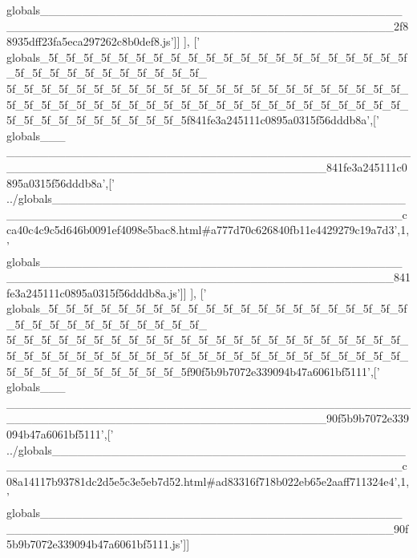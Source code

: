 \begin{DoxyCode}
{      globals\_\_\_\_\_\_\_\_\_\_\_\_\_\_\_\_\_\_\_\_\_\_\_\_\_\_\_\_\_\_\_\_\_\_\_\_\_\_\_\_\_\_\_\_\_\_\_\_\_\_\_\_\_\_\_\_\_\_\_\_\_\_\_\_\_\_\_\_\_\_\_\_\_\_\_\_\_\_\_\_\_\_\_\_\_\_\_\_\_2f88935dff23fa5eca297262c8b0def8.js'}]]
      ],
  [\textcolor{stringliteral}{'
      globals\_5f\_5f\_5f\_5f\_5f\_5f\_5f\_5f\_5f\_5f\_5f\_5f\_5f\_5f\_5f\_5f\_5f\_5f\_5f\_5f\_5f\_5f\_5f\_5f\_5f\_5f\_5f\_5f\_5f\_5f\_5f\_5f\_
      5f\_5f\_5f\_5f\_5f\_5f\_5f\_5f\_5f\_5f\_5f\_5f\_5f\_5f\_5f\_5f\_5f\_5f\_5f\_5f\_5f\_5f\_5f\_5f\_5f\_5f\_5f\_5f\_5f\_5f\_5f\_5f\_5f\_5f\_5f\_5f\_5f\_5f\_5f\_5f\_5f\_5f\_5f\_5f\_5f\_5f\_5f\_5f\_5f\_5f\_5f\_5f\_5f\_5f\_5f\_5f\_5f841fe3a245111c0895a0315f56dddb8a'},[\textcolor{stringliteral}{'
      globals\_\_\_
      \_\_\_\_\_\_\_\_\_\_\_\_\_\_\_\_\_\_\_\_\_\_\_\_\_\_\_\_\_\_\_\_\_\_\_\_\_\_\_\_\_\_\_\_\_\_\_\_\_\_\_\_\_\_\_\_\_\_\_\_\_\_\_\_\_\_\_\_\_\_\_\_\_\_\_\_\_\_\_\_\_\_\_\_\_\_841fe3a245111c0895a0315f56dddb8a'},[\textcolor{stringliteral}{'
      ../globals\_\_\_\_\_\_\_\_\_\_\_\_\_\_\_\_\_\_\_\_\_\_\_\_\_\_\_\_\_\_\_\_\_\_\_\_\_\_\_\_\_\_\_\_\_\_\_\_\_\_\_\_\_\_\_\_\_\_\_\_\_\_\_\_\_\_\_\_\_\_\_\_\_\_\_\_\_\_\_\_\_\_\_\_\_\_\_\_\_cca40c4c9c5d646b0091ef4098e5bac8.html#a777d70c626840fb11e4429279c19a7d3'},1,\textcolor{stringliteral}{'
      globals\_\_\_\_\_\_\_\_\_\_\_\_\_\_\_\_\_\_\_\_\_\_\_\_\_\_\_\_\_\_\_\_\_\_\_\_\_\_\_\_\_\_\_\_\_\_\_\_\_\_\_\_\_\_\_\_\_\_\_\_\_\_\_\_\_\_\_\_\_\_\_\_\_\_\_\_\_\_\_\_\_\_\_\_\_\_\_\_\_841fe3a245111c0895a0315f56dddb8a.js'}]]
      ],
  [\textcolor{stringliteral}{'
      globals\_5f\_5f\_5f\_5f\_5f\_5f\_5f\_5f\_5f\_5f\_5f\_5f\_5f\_5f\_5f\_5f\_5f\_5f\_5f\_5f\_5f\_5f\_5f\_5f\_5f\_5f\_5f\_5f\_5f\_5f\_5f\_5f\_
      5f\_5f\_5f\_5f\_5f\_5f\_5f\_5f\_5f\_5f\_5f\_5f\_5f\_5f\_5f\_5f\_5f\_5f\_5f\_5f\_5f\_5f\_5f\_5f\_5f\_5f\_5f\_5f\_5f\_5f\_5f\_5f\_5f\_5f\_5f\_5f\_5f\_5f\_5f\_5f\_5f\_5f\_5f\_5f\_5f\_5f\_5f\_5f\_5f\_5f\_5f\_5f\_5f\_5f\_5f\_5f\_5f90f5b9b7072e339094b47a6061bf5111'},[\textcolor{stringliteral}{'
      globals\_\_\_
      \_\_\_\_\_\_\_\_\_\_\_\_\_\_\_\_\_\_\_\_\_\_\_\_\_\_\_\_\_\_\_\_\_\_\_\_\_\_\_\_\_\_\_\_\_\_\_\_\_\_\_\_\_\_\_\_\_\_\_\_\_\_\_\_\_\_\_\_\_\_\_\_\_\_\_\_\_\_\_\_\_\_\_\_\_\_90f5b9b7072e339094b47a6061bf5111'},[\textcolor{stringliteral}{'
      ../globals\_\_\_\_\_\_\_\_\_\_\_\_\_\_\_\_\_\_\_\_\_\_\_\_\_\_\_\_\_\_\_\_\_\_\_\_\_\_\_\_\_\_\_\_\_\_\_\_\_\_\_\_\_\_\_\_\_\_\_\_\_\_\_\_\_\_\_\_\_\_\_\_\_\_\_\_\_\_\_\_\_\_\_\_\_\_\_\_\_c08a14117b93781dc2d5e5c3e5eb7d52.html#ad83316f718b022eb65e2aaff711324e4'},1,\textcolor{stringliteral}{'
      globals\_\_\_\_\_\_\_\_\_\_\_\_\_\_\_\_\_\_\_\_\_\_\_\_\_\_\_\_\_\_\_\_\_\_\_\_\_\_\_\_\_\_\_\_\_\_\_\_\_\_\_\_\_\_\_\_\_\_\_\_\_\_\_\_\_\_\_\_\_\_\_\_\_\_\_\_\_\_\_\_\_\_\_\_\_\_\_\_\_90f5b9b7072e339094b47a6061bf5111.js'}]]

\end{DoxyCode}
